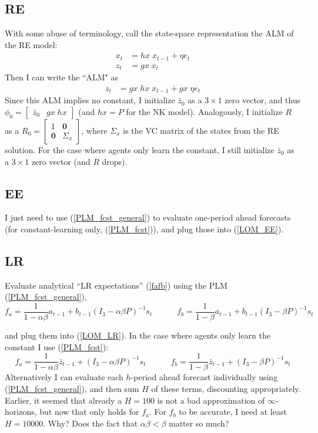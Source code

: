 \documentclass[11pt]{article}
\renewcommand{\[}{\begin{equation}}
\renewcommand{\]}{\end{equation}}
\begin{document}
\subsection{RE}
With some abuse of terminology, call the state-space representation the ALM of the RE model:
\begin{align}
x_{t} & = hx \; x_{t-1} + \eta e_t \label{state_eq}\\
z_t & = gx \; x_t \label{obs_eq}
\end{align}
Then I can write the ``ALM" as
\begin{align}
z_t & = gx \; hx \; x_{t-1} + gx \; \eta e_t  \label{ALM_RE}
\end{align}
Since this ALM implies no constant, I initialize $\bar{z}_0$ as a $3\times1$ zero vector, and thus $\phi_0 = \begin{bmatrix} \bar{z}_0 & gx \; hx\end{bmatrix} $ (and $hx = P$ for the NK model). Analogously, I initialize $R$ as a $R_0 = \begin{bmatrix} 1 & \mathbf{0} \\ \mathbf{0} & \Sigma_x \end{bmatrix}$, where $\Sigma_x$ is the VC matrix of the states from the RE solution. For the case where agents only learn the constant, I still initialize $\bar{z}_0$ as a $3\times1$ zero vector (and $R$ drops).
\subsection{EE}
I just need to use (\ref{PLM_fcst_general}) to evaluate one-period ahead forecasts (for constant-learning only, (\ref{PLM_fcst})), and plug those into (\ref{LOM_EE}).

\subsection{LR}
Evaluate analytical ``LR expectations'' (\ref{fafb}) using the PLM (\ref{PLM_fcst_general}), 
\begin{equation}
f_a = \frac{1}{1-\alpha\beta}a_{t-1}  + b_{t-1}(I_3 - \alpha\beta P)^{-1}s_t \quad \quad \quad f_b = \frac{1}{1-\beta}a_{t-1}  + b_{t-1}(I_3 - \beta P)^{-1}s_t  \label{fafb_analytical_general}
\end{equation}

and plug them into (\ref{LOM_LR}). In the case where agents only learn the constant I use (\ref{PLM_fcst}):
\begin{equation}
f_a = \frac{1}{1-\alpha\beta}\bar{z}_{t-1}  + (I_3 - \alpha\beta P)^{-1}s_t \quad \quad \quad f_b = \frac{1}{1-\beta}\bar{z}_{t-1}  + (I_3 - \beta P)^{-1}s_t  \label{fafb_analytical}
\end{equation}
Alternatively I can evaluate each $h$-period ahead forecast individually using (\ref{PLM_fcst_general}), and then sum $H$ of these terms, discounting appropriately. Earlier, it seemed that already a $H=100$ is not a bad approximation of $\infty$-horizons, but now that only holds for $f_a$. For $f_b$ to be accurate, I need at least $H=10000$. Why? Does the fact that $\alpha\beta < \beta$ matter so much?
\end{document}
